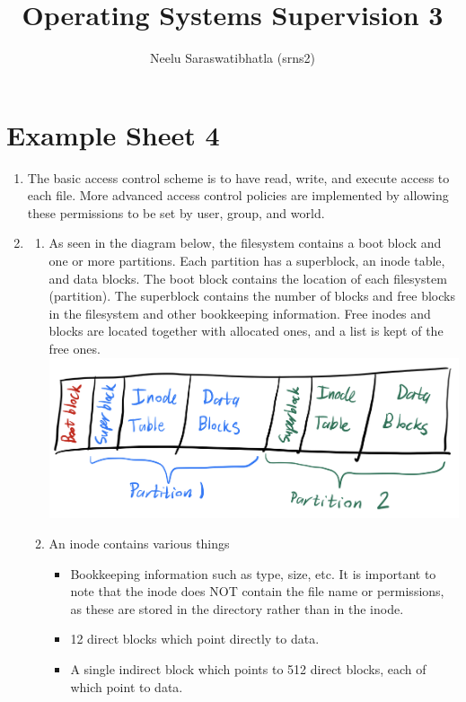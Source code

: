 \documentclass[12pt]{article}
\author{Neelu Saraswatibhatla (srns2)}
\title{Operating Systems Supervision 3}
\date{\vspace{-5ex}}
\begin{document}
\maketitle

\section{Example Sheet 4}

\begin{enumerate}
    \item The basic access control scheme is to have read, write, and execute access to each file. More advanced access control policies are implemented by allowing these permissions to be set by user, group, and world.
    \item \begin{enumerate}
        \item As seen in the diagram below, the filesystem contains a boot block and one or more partitions. Each partition has a superblock, an inode table, and data blocks. The boot block contains the location of each filesystem (partition). The superblock contains the number of blocks and free blocks in the filesystem and other bookkeeping information. Free inodes and blocks are located together with allocated ones, and a list is kept of the free ones.\\
        \includegraphics[scale=0.25]{2a.jpg}
        \item An inode contains various things \begin{itemize}
            \item Bookkeeping information such as type, size, etc. It is important to note that the inode does NOT contain the file name or permissions, as these are stored in the directory rather than in the inode.
            \item 12 direct blocks which point directly to data.
            \item A single indirect block which points to 512 direct blocks, each of which point to data.

\end{itemize}
\end{enumerate}
\end{enumerate}
\end{document}
